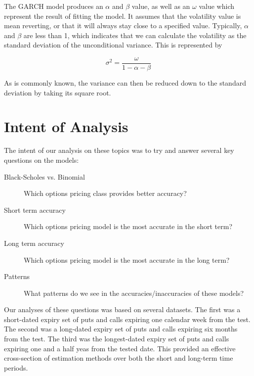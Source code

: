 The GARCH model produces an $\alpha$ and $\beta$ value, as well as an $\omega$ value which represent the result of fitting the model. It assumes that the volatility value is mean reverting, or that it will always stay close to a specified value. Typically, $\alpha$ and $\beta$ are less than 1, which indicates that we can calculate the volatility as the standard deviation of the unconditional variance. This is represented by

\begin{equation}
\sigma^2 = \frac{\omega}{1 - \alpha - \beta}
\end{equation}

As is commonly known, the variance can then be reduced down to the standard deviation by taking its square root.

\section{Intent of Analysis}

The intent of our analysis on these topics was to try and answer several key questions on the models:

\begin{description}
\item[Black-Scholes vs. Binomial] Which options pricing class provides better accuracy?
\item[Short term accuracy] Which options pricing model is the most accurate in the short term?
\item[Long term accuracy] Which options pricing model is the most accurate in the long term?
\item[Patterns] What patterns do we see in the accuracies/inaccuracies of these models?
\end{description}

Our analyses of these questions was based on several datasets. The first was a short-dated expiry set of puts and calls expiring one calendar week from the test. The second was a long-dated expiry set of puts and calls expiring six months from the test. The third was the  longest-dated expiry set of puts and calls expiring one and a half yeas from the tested date. This provided an effective cross-section of estimation methods over both the short and long-term time periods. 


